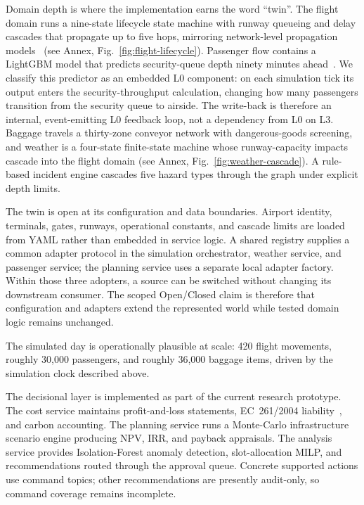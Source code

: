 \documentclass[runningheads]{llncs}
\begin{document}
Domain depth is where the implementation earns the word ``twin''. The flight domain runs a nine-state lifecycle state machine with runway queueing and delay cascades that propagate up to five hops, mirroring network-level propagation models~\cite{pyrgiotis2013} (see Annex, Fig.~\ref{fig:flight-lifecycle}). Passenger flow contains a LightGBM model that predicts security-queue depth ninety minutes ahead~\cite{ke2017,schultz2019}. We classify this predictor as an embedded L0 component: on each simulation tick its output enters the security-throughput calculation, changing how many passengers transition from the security queue to airside. The write-back is therefore an internal, event-emitting L0 feedback loop, not a dependency from L0 on L3. Baggage travels a thirty-zone conveyor network with dangerous-goods screening, and weather is a four-state finite-state machine whose runway-capacity impacts cascade into the flight domain (see Annex, Fig.~\ref{fig:weather-cascade}). A rule-based incident engine cascades five hazard types through the graph under explicit depth limits.

The twin is open at its configuration and data boundaries. Airport identity, terminals, gates, runways, operational constants, and cascade limits are loaded from YAML rather than embedded in service logic. A shared registry supplies a common adapter protocol in the simulation orchestrator, weather service, and passenger service; the planning service uses a separate local adapter factory. Within those three adopters, a source can be switched without changing its downstream consumer. The scoped Open/Closed claim is therefore that configuration and adapters extend the represented world while tested domain logic remains unchanged.

The simulated day is operationally plausible at scale: 420 flight movements, roughly 30{,}000 passengers, and roughly 36{,}000 baggage items, driven by the simulation clock described above.

The decisional layer is implemented as part of the current research prototype. The cost service maintains profit-and-loss statements, EC~261/2004 liability~\cite{eu261}, and carbon accounting. The planning service runs a Monte-Carlo infrastructure scenario engine producing NPV, IRR, and payback appraisals. The analysis service provides Isolation-Forest anomaly detection, slot-allocation MILP, and recommendations routed through the approval queue. Concrete supported actions use command topics; other recommendations are presently audit-only, so command coverage remains incomplete.
\end{document}
